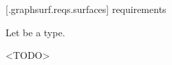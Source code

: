 
 [\iotwod.graphsurf.reqs.surfaces]{ requirements}

\pnum
Let  be a \graphicssurfacestemplparam type.

\pnum
<TODO>

%
